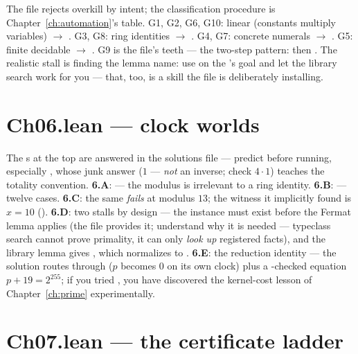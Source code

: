 The file rejects overkill by intent; the classification procedure is
Chapter~\ref{ch:automation}'s table. G1, G2, G6, G10: linear (constants
multiply variables) $\to$ . G3, G8: ring identities $\to$
. G4, G7: concrete numerals $\to$ . G5:
finite decidable $\to$ . G9 is the file's teeth --- the
two-step pattern:  then . The realistic stall is
finding the lemma name: use  on the 's goal and
let the library search work for you --- that, too, is a skill the file
is deliberately installing.

\section{Ch06.lean --- clock worlds}

The s at the top are answered in the solutions file ---
predict before running, especially , whose junk
answer ($1$ --- \emph{not} an inverse; check $4 \cdot 1$) teaches the
totality convention. \textbf{6.A}:  --- the modulus is
irrelevant to a ring identity. \textbf{6.B}:  --- twelve
cases. \textbf{6.C}: the same  \emph{fails} at modulus
$13$; the witness it implicitly found is $x = 10$
(). \textbf{6.D}: two stalls by design ---
the  instance must exist before the Fermat
lemma applies (the file provides it; understand why it is needed ---
typeclass search cannot prove primality, it can only \emph{look up}
registered facts), and the library lemma gives ,
which  normalizes to . \textbf{6.E}: the
reduction identity --- the solution routes through
 ($p$ becomes $0$ on its own clock) plus a
-checked equation $p + 19 = 2^{255}$; if you tried
, you have discovered the kernel-cost lesson of
Chapter~\ref{ch:prime} experimentally.

\section{Ch07.lean --- the certificate ladder}

